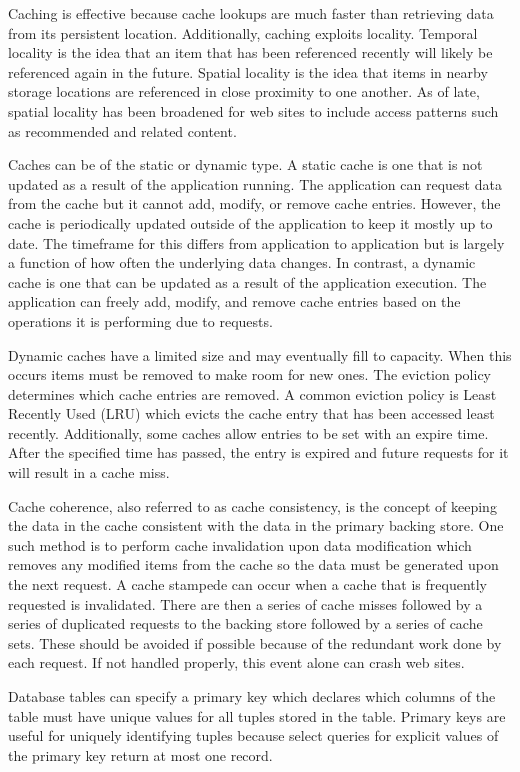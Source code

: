 \documentclass[12pt]{ucthesis}
\begin{document}
Caching is effective because cache lookups are much faster than retrieving data from its persistent location.
Additionally, caching exploits locality.
Temporal locality is the idea that an item that has been referenced recently will likely be referenced again in the future.
Spatial locality is the idea that items in nearby storage locations are referenced in close proximity to one another.
As of late, spatial locality has been broadened for web sites to include access patterns such as recommended and related content.

Caches can be of the static or dynamic type.
A static cache is one that is not updated as a result of the application running.
The application can request data from the cache but it cannot add, modify, or remove cache entries.
However, the cache is periodically updated outside of the application to keep it mostly up to date.
The timeframe for this differs from application to application but is largely a function of how often the underlying data changes.
In contrast, a dynamic cache is one that can be updated as a result of the application execution.
The application can freely add, modify, and remove cache entries based on the operations it is performing due to requests.

Dynamic caches have a limited size and may eventually fill to capacity.
When this occurs items must be removed to make room for new ones.
The eviction policy determines which cache entries are removed.
A common eviction policy is Least Recently Used (LRU) which evicts the cache entry that has been accessed least recently.
Additionally, some caches allow entries to be set with an expire time.
After the specified time has passed, the entry is expired and future requests for it will result in a cache miss.

Cache coherence, also referred to as cache consistency, is the concept of keeping the data in the cache consistent with the data in the primary backing store.
One such method is to perform cache invalidation upon data modification which removes any modified items from the cache so the data must be generated upon the next request.
A cache stampede can occur when a cache that is frequently requested is invalidated.
There are then a series of cache misses followed by a series of duplicated requests to the backing store followed by a series of cache sets.
These should be avoided if possible because of the redundant work done by each request.
If not handled properly, this event alone can crash web sites.

Database tables can specify a primary key which declares which columns of the table must have unique values for all tuples stored in the table.
Primary keys are useful for uniquely identifying tuples because select queries for explicit values of the primary key return at most one record.
\end{document}
